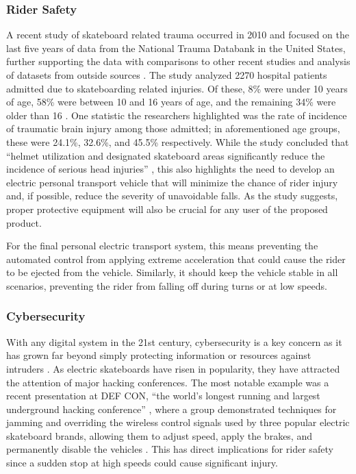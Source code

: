 \subsubsection{Rider Safety}
A recent study of skateboard related trauma occurred in 2010 and focused on the last five years of data from the National Trauma Databank in the United States, further supporting the data with comparisons to other recent studies and analysis of datasets from outside sources \cite{Injury}. The study analyzed 2270 hospital patients admitted due to skateboarding related injuries. Of these, 8\% were under 10 years of age, 58\% were between 10 and 16 years of age, and the remaining 34\% were older than 16 \cite{Injury}. One statistic the researchers highlighted was the rate of incidence of traumatic brain injury among those admitted; in aforementioned age groups, these were 24.1\%, 32.6\%, and 45.5\% respectively\cite{Injury}. While the study concluded that ``helmet utilization and designated skateboard areas significantly reduce the incidence of serious head injuries'' \cite{Injury}, this also highlights the need to develop an electric personal transport vehicle that will minimize the chance of rider injury and, if possible, reduce the severity of unavoidable falls. As the study suggests, proper protective equipment will also be crucial for any user of the proposed product. 

For the final personal electric transport system, this means preventing the automated control from applying extreme acceleration that could cause the rider to be ejected from the vehicle. Similarly, it should keep the vehicle stable in all scenarios, preventing the rider from falling off during turns or at low speeds.

\subsubsection{Cybersecurity}
With any digital system in the 21st century, cybersecurity is a key concern as it has grown far beyond simply protecting information or resources against intruders \cite{cybersecurity}. As electric skateboards have risen in popularity, they have attracted the attention of major hacking conferences. The most notable example was a recent presentation at DEF CON, ``the world's longest running and largest underground hacking conference'' \cite{DEFCONsite}, where a group demonstrated techniques for jamming and overriding the wireless control signals used by three popular electric skateboard brands, allowing them to adjust speed, apply the brakes, and permanently disable the vehicles \cite{DEFCON,wiredArticle}. This has direct implications for rider safety since a sudden stop at high speeds could cause significant injury. 

